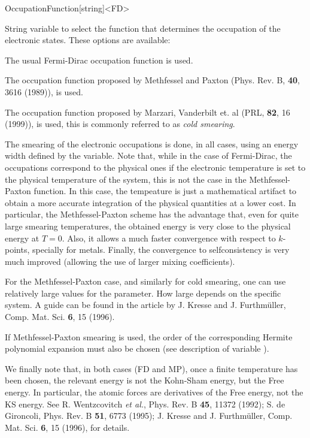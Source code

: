 \begin{fdfentry}{OccupationFunction}[string]<FD>
  
  String variable to select the function that determines the
  occupation of the electronic states. These options are available:
  \begin{fdfoptions}
    \option[FD]%
    The usual Fermi-Dirac occupation function is used.

    \option[MP]%
    The occupation function proposed by Methfessel and
    Paxton (Phys. Rev. B, \textbf{40}, 3616 (1989)), is used.

    \option[Cold]%
    The occupation function proposed by Marzari, Vanderbilt et. al
    (PRL, \textbf{82}, 16 (1999)), is used, this is commonly referred
    to as \emph{cold smearing}.

  \end{fdfoptions}
  The smearing of the electronic occupations is done, in all cases,
  using an energy width defined by the 
  variable. Note that, while in the case of Fermi-Dirac, the
  occupations correspond to the physical ones if the electronic
  temperature is set to the physical temperature of the system, this
  is not the case in the Methfessel-Paxton function. In this case, the
  tempeature is just a mathematical artifact to obtain a more accurate
  integration of the physical quantities at a lower cost. In
  particular, the Methfessel-Paxton scheme has the advantage that,
  even for quite large smearing temperatures, the obtained energy is
  very close to the physical energy at $T=0$. Also, it allows a much
  faster convergence with respect to $k$-points, specially for
  metals. Finally, the convergence to selfconsistency is very much
  improved (allowing the use of larger mixing coefficients).

  For the Methfessel-Paxton case, and similarly for cold smearing, one
  can use relatively large values for the 
  parameter. How large depends on the specific system. A guide can be
  found in the article by J. Kresse and J. Furthm\"uller,
  Comp. Mat. Sci. \textbf{6}, 15 (1996).

  If Methfessel-Paxton smearing is used, the order of the
  corresponding Hermite polynomial expansion must also be chosen (see
  description of variable ).

  We finally note that, in both cases (FD and MP), once a finite
  temperature has been chosen, the relevant energy is not the
  Kohn-Sham energy, but the Free energy. In particular, the atomic
  forces are derivatives of the Free energy, not the KS energy. See
  R. Wentzcovitch \textit{et al.}, Phys. Rev. B \textbf{45}, 11372
  (1992); S. de Gironcoli, Phys. Rev. B \textbf{51}, 6773 (1995);
  J. Kresse and J. Furthm\"uller, Comp. Mat. Sci.  \textbf{6}, 15
  (1996), for details.

\end{fdfentry}

